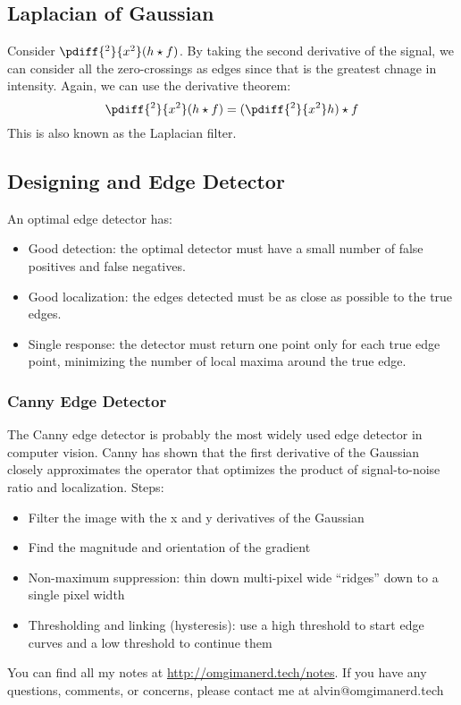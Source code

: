 \documentclass{math}
\begin{document}
\subsection*{Laplacian of Gaussian}
Consider \( \pdiff{^2}{x^2}(h\star f) \). By taking the second derivative of the
signal, we can consider all the zero-crossings as edges since that is the
greatest chnage in intensity. Again, we can use the derivative theorem:
\[ \pdiff{^2}{x^2}(h\star f) = (\pdiff{^2}{x^2}h)\star f \]
This is also known as the Laplacian filter.

\subsection*{Designing and Edge Detector}
An optimal edge detector has:
\begin{itemize}
  \item Good detection: the optimal detector must have a small number of false
    positives and false negatives.
  \item Good localization: the edges detected must be as close as possible to
    the true edges.
  \item Single response: the detector must return one point only for each true
    edge point, minimizing the number of local maxima around the true edge.
\end{itemize}

\subsubsection*{Canny Edge Detector}
The Canny edge detector is probably the most widely used edge detector in
computer vision. Canny has shown that the first derivative of the Gaussian
closely approximates the operator that optimizes the product of signal-to-noise
ratio and localization. Steps:
\begin{itemize}
  \item Filter the image with the x and y derivatives of the Gaussian
  \item Find the magnitude and orientation of the gradient
  \item Non-maximum suppression: thin down multi-pixel wide ``ridges'' down to
    a single pixel width
  \item Thresholding and linking (hysteresis): use a high threshold to start
    edge curves and a low threshold to continue them
\end{itemize}

\begin{center}
  You can find all my notes at \url{http://omgimanerd.tech/notes}. If you have
  any questions, comments, or concerns, please contact me at
  alvin@omgimanerd.tech
\end{center}
\end{document}
